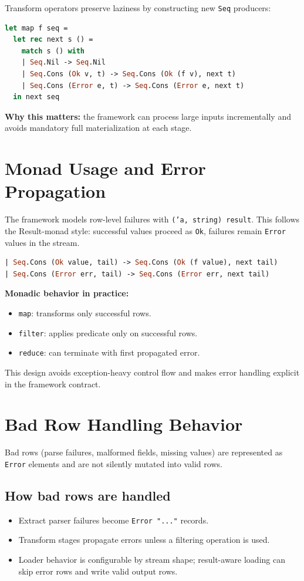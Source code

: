 \documentclass[11pt,a4paper]{article}
\begin{document}
Transform operators preserve laziness by constructing new \texttt{Seq} producers:
\begin{lstlisting}[style=compact, language=Caml]
let map f seq =
  let rec next s () =
    match s () with
    | Seq.Nil -> Seq.Nil
    | Seq.Cons (Ok v, t) -> Seq.Cons (Ok (f v), next t)
    | Seq.Cons (Error e, t) -> Seq.Cons (Error e, next t)
  in next seq
\end{lstlisting}

\textbf{Why this matters:} the framework can process large inputs incrementally and avoids mandatory full materialization at each stage.

\section{Monad Usage and Error Propagation}
The framework models row-level failures with \texttt{('a, string) result}. This follows the Result-monad style: successful values proceed as \texttt{Ok}, failures remain \texttt{Error} values in the stream.

\begin{lstlisting}[style=compact, language=Caml]
| Seq.Cons (Ok value, tail) -> Seq.Cons (Ok (f value), next tail)
| Seq.Cons (Error err, tail) -> Seq.Cons (Error err, next tail)
\end{lstlisting}

\textbf{Monadic behavior in practice:}
\begin{itemize}
  \item \texttt{map}: transforms only successful rows.
  \item \texttt{filter}: applies predicate only on successful rows.
  \item \texttt{reduce}: can terminate with first propagated error.
\end{itemize}

This design avoids exception-heavy control flow and makes error handling explicit in the framework contract.

\section{Bad Row Handling Behavior}
Bad rows (parse failures, malformed fields, missing values) are represented as \texttt{Error} elements and are not silently mutated into valid rows.

\subsection*{How bad rows are handled}
\begin{itemize}
  \item Extract parser failures become \texttt{Error "..."} records.
  \item Transform stages propagate errors unless a filtering operation is used.
  \item Loader behavior is configurable by stream shape; result-aware loading can skip error rows and write valid output rows.
\end{itemize}
\end{document}
